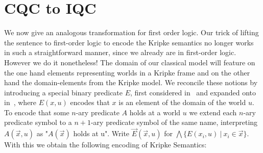 \documentclass{easychair}
\theoremstyle{definition}
\theoremstyle{definition}
\theoremstyle{definition}
\theoremstyle{definition}
\theoremstyle{definition}
\theoremstyle{definition}
\theoremstyle{definition}
\begin{document}
\section{CQC to IQC}

We now give an analogous transformation for first order logic. Our trick of lifting the sentence to first-order logic to encode the Kripke semantics no longer works in such a straightforward manner, since we already are in first-order logic. However we do it nonetheless! The domain of our classical model will feature on the one hand elements representing worlds in a Kripke frame and on the other hand the domain-elements from the Kripke model. We reconcile these notions by introducing a special binary predicate $E$, first considered in~\cite{baaz2006skolemization} and expanded onto in~\cite{iemhoff2010eskolemization}, where $E(x, u)$ encodes that $x$ is an element of the domain of the world $u$. To encode that some $n$-ary predicate $A$ holds at a world $u$ we extend each $n$-ary predicate symbol to a $n+1$-ary predicate symbol of the same name, interpreting $A(\vec x, u)$ as "$A(\vec x)$ holds at u". Write $\vec E(\vec x, u)$ for $\bigwedge\{E(x_i, u)\:|\:x_i\in \vec x\}$. With this we obtain the following encoding of Kripke Semantics:
\end{document}
